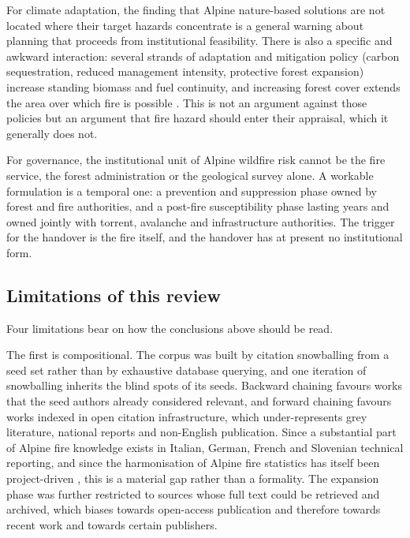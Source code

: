 \documentclass[11pt,a4paper]{article}
\begin{document}
For climate adaptation, the finding that Alpine nature-based solutions are not located where their target hazards concentrate \citep{dubo_nature-based_2023} is a general warning about planning that proceeds from institutional feasibility. There is also a specific and awkward interaction: several strands of adaptation and mitigation policy (carbon sequestration, reduced management intensity, protective forest expansion) increase standing biomass and fuel continuity, and increasing forest cover extends the area over which fire is possible \citep{gerberding_mapping_2025}. This is not an argument against those policies but an argument that fire hazard should enter their appraisal, which it generally does not.

For governance, the institutional unit of Alpine wildfire risk cannot be the fire service, the forest administration or the geological survey alone. A workable formulation is a temporal one: a prevention and suppression phase owned by forest and fire authorities, and a post-fire susceptibility phase lasting years and owned jointly with torrent, avalanche and infrastructure authorities. The trigger for the handover is the fire itself, and the handover has at present no institutional form.

\subsection{Limitations of this review}
\label{sec:limitations}

Four limitations bear on how the conclusions above should be read.

The first is compositional. The corpus was built by citation snowballing from a seed set rather than by exhaustive database querying, and one iteration of snowballing inherits the blind spots of its seeds. Backward chaining favours works that the seed authors already considered relevant, and forward chaining favours works indexed in open citation infrastructure, which under-represents grey literature, national reports and non-English publication. Since a substantial part of Alpine fire knowledge exists in Italian, German, French and Slovenian technical reporting, and since the harmonisation of Alpine fire statistics has itself been project-driven \citep{valese_wildfires_2011, muller_forest_2020}, this is a material gap rather than a formality. The expansion phase was further restricted to sources whose full text could be retrieved and archived, which biases towards open-access publication and therefore towards recent work and towards certain publishers.
\end{document}
